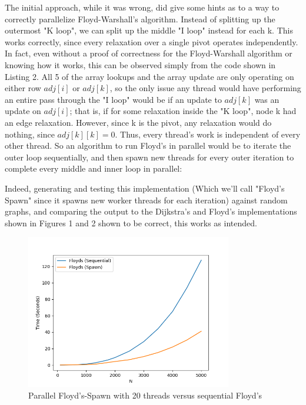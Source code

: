 \documentclass[conference]{IEEEtran}
\begin{document}
The initial approach, while it was wrong, did give some hints as to a way to correctly parallelize Floyd-Warshall's algorithm. Instead of splitting up the outermost "K loop", we can split up the middle "I loop" instead for each k. This works correctly, since every relaxation over a single pivot operates independently. In fact, even without a proof of correctness for the Floyd-Warshall algorithm or knowing how it works, this can be observed simply from the code shown in Listing 2. All 5 of the array lookups and the array update are only operating on either row $adj[i]$ or $adj[k]$, so the only issue any thread would have performing an entire pass through the "I loop" would be if an update to $adj[k]$ was an update on $adj[i]$; that is, if for some relaxation inside the "K loop", node k had an edge relaxation. However, since k is the pivot, any relaxation would do nothing, since $adj[k][k] = 0$. Thus, every thread's work is independent of every other thread. So an algorithm to run Floyd's in parallel would be to iterate the outer loop sequentially, and then spawn new threads for every outer iteration to complete every middle and inner loop in parallel:

\break

\begin{figure}[t]
    
\end{figure}

Indeed, generating and testing this implementation (Which we'll call "Floyd's Spawn" since it spawns new worker threads for each iteration) against random graphs, and comparing the output to the Dijkstra's and Floyd's implementations shown in Figures 1 and 2 shown to be correct, this works as intended. 

\begin{figure}[t]
    \centering
    \includegraphics[width=9cm]{images/benchspawn2.png}
    \caption{Parallel Floyd's-Spawn with 20 threads versus sequential Floyd's}
    \label{fig:floyds_spawn}
\end{figure}
\end{document}
